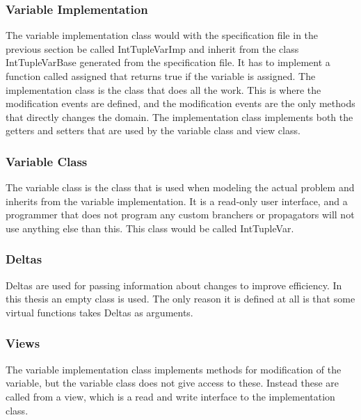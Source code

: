 \documentclass[a4paper,11pt]{article}
\begin{document}
\subsubsection{Variable Implementation}
The variable implementation class would with the specification file in the previous section be called IntTupleVarImp and inherit from the class IntTupleVarBase generated from the specification file. It has to implement a function called assigned that returns true if the variable is assigned. The implementation class is the class that does all the work. This is where the modification events are defined, and the modification events are the only methods that directly changes the domain. The implementation class implements both the getters and setters that are used by the variable class and view class.

\subsubsection{Variable Class}
The variable class is the class that is used when modeling the actual problem and inherits from the variable implementation. It is a read-only user interface, and a programmer that does not program any custom branchers or propagators will not use anything else than this. This class would be called IntTupleVar.
\subsubsection{Deltas}
Deltas are used for passing information about changes to improve efficiency. In this thesis an empty class is used. The only reason it is defined at all is that some virtual functions takes Deltas as arguments.

\subsubsection{Views}
The variable implementation class implements methods for modification of the variable, but the variable class does not give access to these. Instead these are called from a view, which is a read and write interface to the implementation class.
\end{document}
